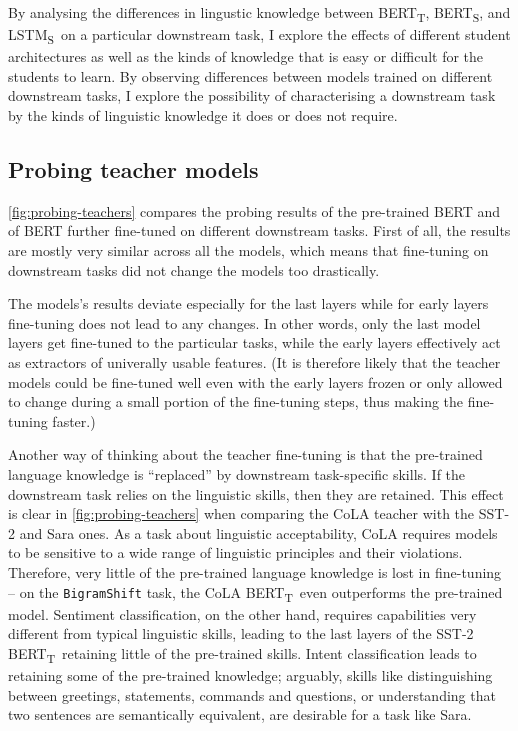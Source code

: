\documentclass[bsc,frontabs,singlespacing,parskip,deptreport]{infthesis}
\def\BERTT{BERT\textsubscript{T}}
\def\BERTS{BERT\textsubscript{S}}
\def\LSTMS{LSTM\textsubscript{S}}
\begin{document}
{{    %
    By analysing the differences in lingustic knowledge between \BERTT, \BERTS, and \LSTMS~on a particular downstream task, I explore the effects of different student architectures as well as the kinds of knowledge that is easy or difficult for the students to learn.
    By observing differences between models trained on different downstream tasks, I explore the possibility of characterising a downstream task by the kinds of linguistic knowledge it does or does not require.

    \subsection{Probing teacher models}{
      \autoref{fig:probing-teachers} compares the probing results of the pre-trained BERT and of BERT further fine-tuned on different downstream tasks.
      First of all, the results are mostly very similar across all the models, which means that fine-tuning on downstream tasks did not change the models too drastically.

      The models's results deviate especially for the last layers while for early layers fine-tuning does not lead to any changes. In other words, only the last model layers get fine-tuned to the particular tasks, while the early layers effectively act as extractors of univerally usable features. (It is therefore likely that the teacher models could be fine-tuned well even with the early layers frozen or only allowed to change during a small portion of the fine-tuning steps, thus making the fine-tuning faster.)

      Another way of thinking about the teacher fine-tuning is that the pre-trained language knowledge is ``replaced'' by downstream task-specific skills. If the downstream task relies on the linguistic skills, then they are retained.
      This effect is clear in \autoref{fig:probing-teachers} when comparing the CoLA teacher with the SST-2 and Sara ones. As a task about linguistic acceptability, CoLA requires models to be sensitive to a wide range of linguistic principles and their violations. Therefore, very little of the pre-trained language knowledge is lost in fine-tuning -- on the \verb|BigramShift| task, the CoLA \BERTT~even outperforms the pre-trained model. Sentiment classification, on the other hand, requires capabilities very different from typical linguistic skills, leading to the last layers of the SST-2 \BERTT~retaining little of the pre-trained skills. Intent classification leads to retaining some of the pre-trained knowledge; arguably, skills like distinguishing between greetings, statements, commands and questions, or understanding that two sentences are semantically equivalent, are desirable for a task like Sara.

}}}
\end{document}

